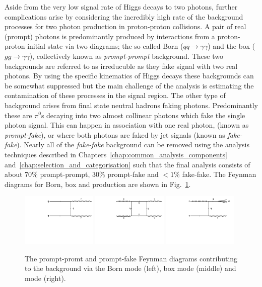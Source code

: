 Aside from the very low signal rate of Higgs decays to two photons, further complications arise by considering the incredibly high rate of the background processes for two photon production in proton-proton collisions. A pair of real (prompt) photons is predominantly produced by \QCD interactions from a proton-proton initial state via two diagrams; the so called Born ($q\bar{q}\rightarrow\gamma\gamma$) and the box ($gg\rightarrow\gamma\gamma$), collectively known as \textit{prompt-prompt} background. These two backgrounds are referred to as irreducuble as they fake signal with two real photons. By using the specific kinematics of Higgs decays these backgrounds can be somewhat suppressed but the main challenge of the analysis is estimating the contamination of these processes in the signal region. The other type of background arises from final state neutral hadrons faking photons. Predominantly these are $\pi^{0}$s decaying into two almost collinear photons which fake the single photon signal. This can happen in association with one real photon, \gjet (known as \textit{prompt-fake}), or where both photons are faked by jet signals (known as \textit{fake-fake}). Nearly all of the \textit{fake-fake} background can be removed using the analysis techniques described in Chapters~\ref{chap:common_analysis_components} and~\ref{chap:selection_and_categorisation} such that the final analysis consists of about 70\% prompt-prompt, 30\% prompt-fake and $<1\%$ fake-fake. The Feynman diagrams for Born, box and \gjet production are shown in Fig.~\ref{fig:feyn_bkgs}.

\begin{figure}
  \includegraphics[width=0.32\textwidth]{theory/plots/Born.pdf}
  \includegraphics[width=0.32\textwidth]{theory/plots/Box.pdf}
  \includegraphics[width=0.32\textwidth]{theory/plots/GJet.pdf}
  \caption[Higgs to two photon backgrounds at the \acs{LHC}]{The prompt-promt and prompt-fake Feynman diagrams contributing to the \Hgg background via the Born mode (left), box mode (middle) and \gjet mode (right).}
  \label{fig:feyn_bkgs}
\end{figure}


